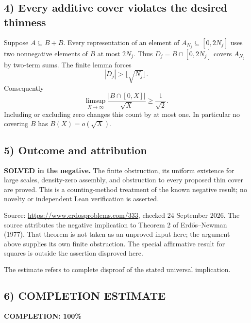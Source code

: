 \subsection*{4) Every additive cover violates the desired thinness}
Suppose $A\subseteq B+B$. Every representation of an element of $A_{N_j}\subseteq[0,2N_j]$ uses two nonnegative elements of $B$ at most $2N_j$. Thus $D_j=B\cap[0,2N_j]$ covers $A_{N_j}$ by two-term sums. The finite lemma forces
\[|D_j|>\lfloor\sqrt{N_j}\rfloor.
\]
Consequently
\[\limsup_{X\to\infty}\frac{|B\cap[0,X]|}{\sqrt X}\ge\frac1{\sqrt2}.
\]
Including or excluding zero changes this count by at most one. In particular no covering $B$ has $B(X)=o(\sqrt X)$.

\subsection*{5) Outcome and attribution}
\textbf{SOLVED in the negative.} The finite obstruction, its uniform existence for large scales, density-zero assembly, and obstruction to every proposed thin cover are proved. This is a counting-method treatment of the known negative result; no novelty or independent Lean verification is asserted.

Source: \url{https://www.erdosproblems.com/333}, checked 24 September 2026. The source attributes the negative implication to Theorem 2 of Erd\H{o}s--Newman (1977). That theorem is not taken as an unproved input here; the argument above supplies its own finite obstruction. The special affirmative result for squares is outside the assertion disproved here.

The estimate refers to complete disproof of the stated universal implication.
\subsection*{6) COMPLETION ESTIMATE}
\textbf{COMPLETION: 100\%}
